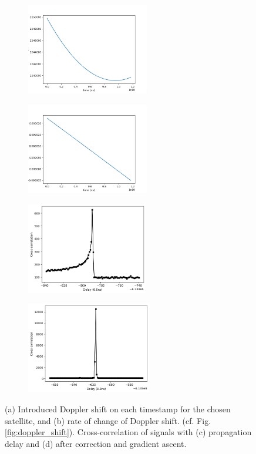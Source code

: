 \begin{figure}[ht!]
	\centering
	\begin{subfigure}[t]{0.49\linewidth}
		\centering
		\includegraphics[height=4cm]{assets/delay.png}
		\subcaption{}
	\end{subfigure}
	\begin{subfigure}[t]{0.49\textwidth}
		\centering
		\includegraphics[height=4cm]{assets/range_velocity.png}
		\subcaption{}
	\end{subfigure}
	\begin{subfigure}[t]{0.49\linewidth}
		\centering
		\includegraphics[height=4cm]{assets/propagationDelay_cc.png}
		\subcaption{}
	\end{subfigure}
	\begin{subfigure}[t]{0.49\textwidth}
		\centering
		\includegraphics[height=4cm]{assets/propagationDelayGuess_cc.png}
		\subcaption{}
	\end{subfigure}
	\caption{(a) Introduced Doppler shift on each timestamp for the chosen satellite, and (b) rate of change of Doppler shift. (cf. Fig. \ref{fig:doppler_shift}). Cross-correlation of signals with (c) propagation delay and (d) after correction and gradient ascent.}
	\label{fig:real_shift}
\end{figure}


